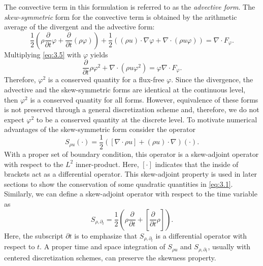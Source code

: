 The convective term in this formulation is referred to as the \emph{advective form}. The \emph{skew-symmetric} form for the convective term is obtained by the arithmetic average of the divergent and the advective form:
\begin{equation} \label{eq:3.5}
	\frac{1}{2} \left( \rho \frac{\partial }{\partial t} \varphi + \frac{\partial }{\partial t} (\rho \varphi) \right) + \frac 1 2 \left( (\rho u)\cdot \nabla \varphi + \nabla \cdot (\rho u \varphi) \right) = \nabla \cdot F_{\varphi}.
\end{equation}
Multiplying \eqref{eq:3.5} with $\varphi$ yields
\begin{equation}
	\frac{\partial }{\partial t} \rho \varphi^2 + \nabla \cdot ( \rho u \varphi^2  ) = \varphi \nabla \cdot F_{\varphi}.
\end{equation}
Therefore, $\varphi^2$ is a conserved quantity for a flux-free $\varphi$. Since the divergence, the advective and the skew-symmetric forms are identical at the continuous level, then $\varphi^2$ is a conserved quantity for all forms. However, equivalence of these forms is not preserved through a general discretization scheme and, therefore, we do not expect $\varphi^2$ to be a conserved quantity at the discrete level. To motivate numerical advantages of the skew-symmetric form consider the operator 
\begin{equation}
	S_{\rho u}(\cdot) = \frac 1 2 ( [ \nabla \cdot \rho u ] + (\rho u)\cdot \nabla )(\cdot).
\end{equation}
With a proper set of boundary condition, this operator is a skew-adjoint operator with respect to the $L^2$ inner-product. Here, $[\cdot]$ indicates that the inside of brackets act as a differential operator. This skew-adjoint property is used in later sections to show the conservation of some quadratic quantities in \eqref{eq:3.1}. Similarly, we can define a skew-adjoint operator with respect to the time variable as
\begin{equation}
	S_{\rho,\partial_t} = \frac{1}{2} \left( \rho \frac{\partial}{\partial t} + [ \frac{\partial}{\partial t} \rho] \right).
\end{equation}
Here, the subscript $\partial t$ is to emphasize that $S_{\rho,\partial_t}$ is a differential operator with respect to $t$. A proper time and space integration of $S_{\rho u}$ and $S_{\rho,\partial_t}$, usually with centered discretization schemes, can preserve the skewness property.

